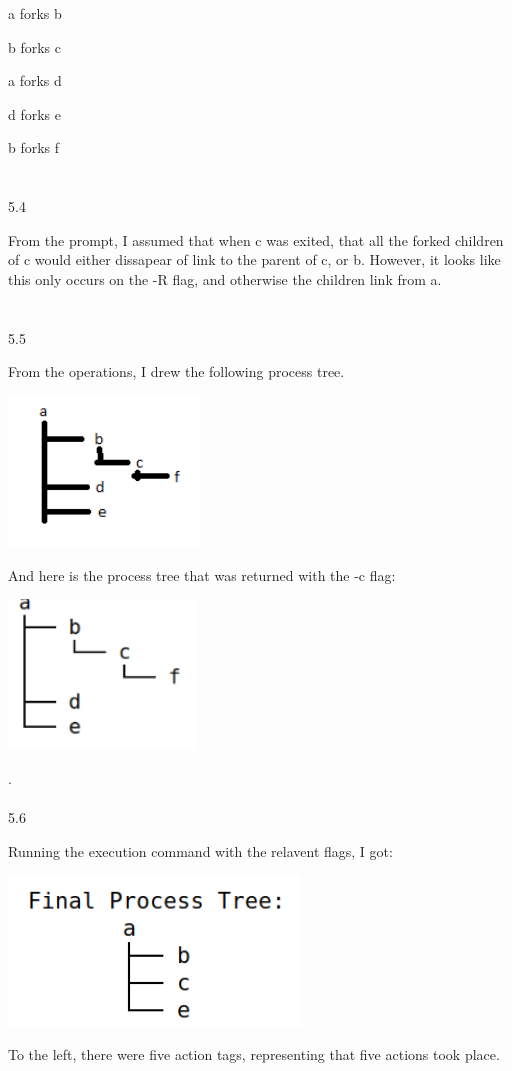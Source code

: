 \documentclass[12pt, a4paper]{article}
\begin{document}
	a forks b
	
	b forks c
	
	a forks d
	
	d forks e
	
	b forks f \\ \\ \\
	
5.4
	
	From the prompt, I assumed that when c was exited, that all the forked children of c would either dissapear of link to the parent of c, or b.  However, it looks like this only occurs on the -R flag, and otherwise the children link from a. \\ \\ \\

5.5

	From the operations, I drew the following process tree.
	
	\begin{center}
	\includegraphics[height=4cm]{hw1_5_5.png}\\
	\end{center}
	
	And here is the process tree that was returned with the -c flag:
	
	\begin{center}
	\includegraphics[height=4cm]{hw1_5_5_a.png}\\
	\end{center}
	. \\ \\ 

5.6

	Running the execution command with the relavent flags, I got:
	\begin{center}
	\includegraphics[height=4cm]{hw1_5_6.png}\\
	\end{center}
	To the left, there were five action tags, representing that five actions took place.
	
\end{document}
